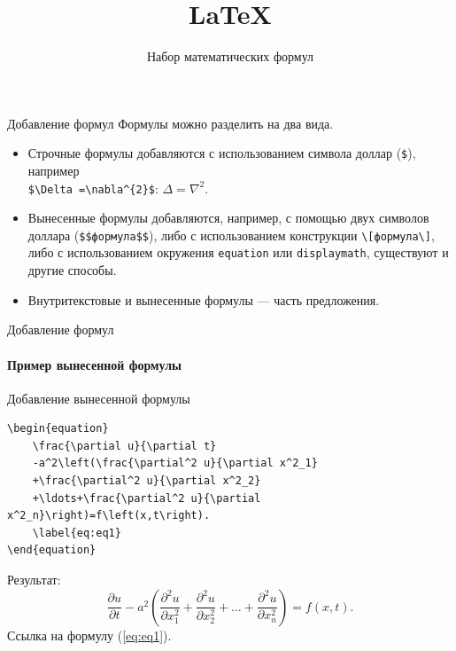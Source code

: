 \documentclass[10pt,aspectratio=169]{beamer}
\title{\LaTeX}
\subtitle{Набор математических формул}
\begin{document}
    \maketitle
    
    \begin{frame}[fragile]{Добавление формул}
    	Формулы можно разделить на два вида.
    	\begin{itemize}
    		\item Строчные формулы добавляются с использованием символа доллар (\verb|$|), например\\
    		\verb|$\Delta =\nabla^{2}$|: $\Delta =\nabla^{2}$.
    		\item Вынесенные формулы добавляются, например, с помощью двух символов доллара (\verb|$$формула$$|), либо с использованием конструкции \verb|\[формула\]|, либо с использованием окружения
    		\verb|equation| или \verb|displaymath|, существуют и другие способы.
    	\end{itemize}
    	
    	\begin{itemize}
    		\item Внутритекстовые и вынесенные формулы --- часть предложения.
    	\end{itemize}
    \end{frame}
    
    \begin{frame}[fragile]{Добавление формул}
    	\framesubtitle{Пример вынесенной формулы}
    	
    	\begin{block}{Добавление вынесенной формулы}
\begin{lstlisting}
\begin{equation}
	\frac{\partial u}{\partial t}
	-a^2\left(\frac{\partial^2 u}{\partial x^2_1}
	+\frac{\partial^2 u}{\partial x^2_2}
	+\ldots+\frac{\partial^2 u}{\partial x^2_n}\right)=f\left(x,t\right).
	\label{eq:eq1}
\end{equation}
\end{lstlisting}
    	\end{block}
    	
    	Результат:
    	\begin{equation}
    		\frac{\partial u}{\partial t}
    		-a^2\left(\frac{\partial^2 u}{\partial x^2_1}
    		+\frac{\partial^2 u}{\partial x^2_2}
    		+\ldots+\frac{\partial^2 u}{\partial x^2_n}\right)=f\left(x,t\right).
    		\label{eq:eq1}
    	\end{equation}
    	Ссылка на формулу (\ref{eq:eq1}).
    \end{frame}
    
\end{document}
